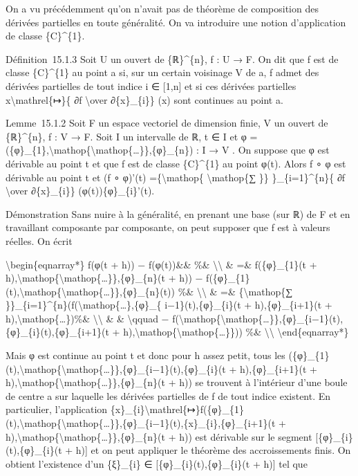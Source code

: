 On a vu précédemment qu'on n'avait pas de théorème de composition des
dérivées partielles en toute généralité. On va introduire une notion
d'application de classe \{C\}\^{}\{1\}.

Définition~15.1.3 Soit U un ouvert de \{ℝ\}\^{}\{n\}, f : U → F. On dit
que f est de classe \{C\}\^{}\{1\} au point a si, sur un certain
voisinage V de a, f admet des dérivées partielles de tout indice i ∈
{[}1,n{]} et si ces dérivées partielles x\textbackslash{}mathrel\{↦\}\{
∂f \textbackslash{}over ∂\{x\}\_\{i\}\} (x) sont continues au point a.

Lemme~15.1.2 Soit F un espace vectoriel de dimension finie, V un ouvert
de \{ℝ\}\^{}\{n\}, f : V → F. Soit I un intervalle de ℝ, t ∈ I et φ =
(\{φ\}\_\{1\},\textbackslash{}mathop\{\textbackslash{}mathop\{\ldots{}\}\},\{φ\}\_\{n\})
: I → V . On suppose que φ est dérivable au point t et que f est de
classe \{C\}\^{}\{1\} au point φ(t). Alors f ∘ φ est dérivable au point
t et (f ∘ φ)'(t) =\{\textbackslash{}mathop\{ \textbackslash{}mathop\{∑
\}\} \}\_\{i=1\}\^{}\{n\}\{ ∂f \textbackslash{}over ∂\{x\}\_\{i\}\}
(φ(t))\{φ\}\_\{i\}'(t).

Démonstration Sans nuire à la généralité, en prenant une base (sur ℝ) de
F et en travaillant composante par composante, on peut supposer que f
est à valeurs réelles. On écrit

\textbackslash{}begin\{eqnarray*\} f(φ(t + h)) − f(φ(t))\&\& \%\&
\textbackslash{}\textbackslash{} \& =\& f(\{φ\}\_\{1\}(t +
h),\textbackslash{}mathop\{\textbackslash{}mathop\{\ldots{}\}\},\{φ\}\_\{n\}(t
+ h)) −
f(\{φ\}\_\{1\}(t),\textbackslash{}mathop\{\textbackslash{}mathop\{\ldots{}\}\},\{φ\}\_\{n\}(t))
\%\& \textbackslash{}\textbackslash{} \& =\& \{\textbackslash{}mathop\{∑
\}\}\_\{i=1\}\^{}\{n\}(f(\textbackslash{}mathop\{\ldots{}\},\{φ\}\_\{
i−1\}(t),\{φ\}\_\{i\}(t + h),\{φ\}\_\{i+1\}(t +
h),\textbackslash{}mathop\{\ldots{}\})\%\&
\textbackslash{}\textbackslash{} \& \& \textbackslash{}qquad −
f(\textbackslash{}mathop\{\textbackslash{}mathop\{\ldots{}\}\},\{φ\}\_\{i−1\}(t),\{φ\}\_\{i\}(t),\{φ\}\_\{i+1\}(t
+ h),\textbackslash{}mathop\{\textbackslash{}mathop\{\ldots{}\}\})) \%\&
\textbackslash{}\textbackslash{} \textbackslash{}end\{eqnarray*\}

Mais φ est continue au point t et donc pour h assez petit, tous les
(\{φ\}\_\{1\}(t),\textbackslash{}mathop\{\textbackslash{}mathop\{\ldots{}\}\},\{φ\}\_\{i−1\}(t),\{φ\}\_\{i\}(t
+ h),\{φ\}\_\{i+1\}(t +
h),\textbackslash{}mathop\{\textbackslash{}mathop\{\ldots{}\}\},\{φ\}\_\{n\}(t
+ h)) se trouvent à l'intérieur d'une boule de centre a sur laquelle les
dérivées partielles de f de tout indice existent. En particulier,
l'application
\{x\}\_\{i\}\textbackslash{}mathrel\{↦\}f(\{φ\}\_\{1\}(t),\textbackslash{}mathop\{\textbackslash{}mathop\{\ldots{}\}\},\{φ\}\_\{i−1\}(t),\{x\}\_\{i\},\{φ\}\_\{i+1\}(t
+
h),\textbackslash{}mathop\{\textbackslash{}mathop\{\ldots{}\}\},\{φ\}\_\{n\}(t
+ h)) est dérivable sur le segment {[}\{φ\}\_\{i\}(t),\{φ\}\_\{i\}(t +
h){]} et on peut appliquer le théorème des accroissements finis. On
obtient l'existence d'un \{ξ\}\_\{i\} ∈
{[}\{φ\}\_\{i\}(t),\{φ\}\_\{i\}(t + h){]} tel que

